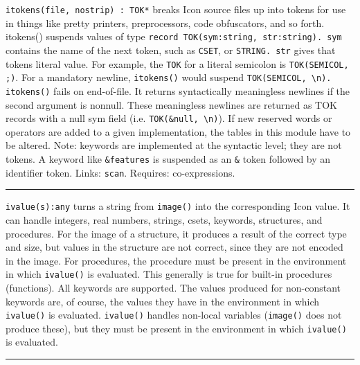 \texttt{itokens(file, nostrip) : TOK*} breaks Icon source files up into
tokens for use in things like pretty printers, preprocessors, code
obfuscators, and so forth. itokens() suspends values of type
\texttt{record TOK(sym:string, str:string). sym} contains the name of
the next token, such as \texttt{{\textquotedbl}CSET{\textquotedbl}}, or
\texttt{{\textquotedbl}STRING{\textquotedbl}. str} gives that
token{\textquotesingle}s literal value. For example, the \texttt{TOK}
for a literal semicolon is
\texttt{TOK({\textquotedbl}SEMICOL{\textquotedbl},
{\textquotedbl};{\textquotedbl})}. For a mandatory newline,
\texttt{itokens()} would suspend
\texttt{TOK({\textquotedbl}SEMICOL{\textquotedbl},
{\textquotedbl}{\textbackslash}n{\textquotedbl}). itokens()} fails on
end-of-file. It returns syntactically meaningless newlines if the
second argument is nonnull. These meaningless newlines are returned as
TOK records with a null sym field (i.e. \texttt{TOK(\&null,
{\textquotedbl}{\textbackslash}n{\textquotedbl})}). If new reserved
words or operators are added to a given implementation, the tables in
this module have to be altered. Note: keywords are implemented at the
syntactic level; they are not tokens. A keyword like
\texttt{\&features} is suspended as an \texttt{\&} token followed by an
identifier token.
Links: \texttt{scan}. Requires: co-expressions.

\vspace{0.25cm}\hrule{}

\texttt{ivalue(s):any} turns a string from \texttt{image()} into the
corresponding Icon value. It can handle integers, real numbers,
strings, csets, keywords, structures, and procedures. For the image of
a structure, it produces a result of the correct type and size, but
values in the structure are not correct, since they are not encoded in
the image. For procedures, the procedure must be present in the
environment in which \texttt{ivalue()} is evaluated. This generally is
true for built-in procedures (functions). All keywords are supported.
The values produced for non-constant keywords are, of course, the
values they have in the environment in which \texttt{ivalue()} is
evaluated. \texttt{ivalue()} handles non-local variables
(\texttt{image()} does not produce these), but they must be present in
the environment in which \texttt{ivalue()} is evaluated. 

\vspace{0.25cm}\hrule{}

